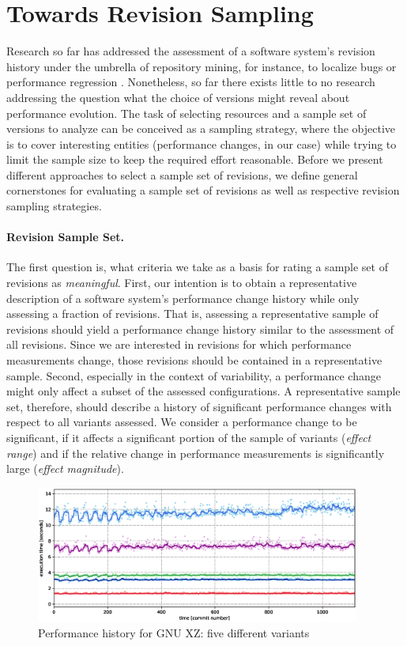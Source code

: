 \section{Towards Revision Sampling}\label{sec:towards_revsampling}
Research so far has addressed the assessment of a software system’s revision
history under the umbrella of repository mining, for instance, to localize bugs
\citep{moin_bug_2010} or performance regression \citep{heger_automated_2013}.
Nonetheless, so far there exists little to no research addressing the question
what the choice of versions might reveal about performance evolution. The task
of selecting resources and a sample set of versions to analyze can be conceived
as a sampling strategy, where the objective is to cover interesting entities
(performance changes, in our case) while trying to limit the sample size to
keep the required effort reasonable. Before we present different approaches to
select a sample set of revisions, we define general cornerstones for
evaluating a sample set of revisions as well as respective revision sampling
strategies.

\paragraph{Revision Sample Set.} The first question is, what criteria we take as
a basis for rating a sample set of revisions as \emph{meaningful}. First, our intention
is to obtain a representative description of a software system’s performance
change history while only assessing a fraction of revisions. That is, assessing
a representative sample of revisions should yield a performance change history
similar to the assessment of all revisions. Since we are interested in
revisions for which performance measurements change, those revisions should be
contained in a representative sample. Second, especially in the context of
variability, a performance change might only affect a subset of the assessed
configurations. A representative sample set, therefore, should describe a
history of significant performance changes with respect to all variants
assessed. We consider a performance change to be significant, if it affects a
significant portion of the sample of variants (\emph{effect range}) and if the
relative change in performance measurements is significantly large (\emph{effect
magnitude}).

\begin{figure}[h!]
	\centering
	\includegraphics[width=0.95\textwidth]{images/xz_sample_evolution.eps}
	\caption{Performance history for GNU XZ: five different variants}
	\label{fig:xz_evosample}
\end{figure}

